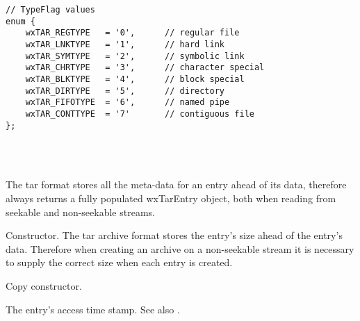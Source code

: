 \begin{verbatim}
// TypeFlag values
enum {
    wxTAR_REGTYPE   = '0',      // regular file
    wxTAR_LNKTYPE   = '1',      // hard link
    wxTAR_SYMTYPE   = '2',      // symbolic link
    wxTAR_CHRTYPE   = '3',      // character special
    wxTAR_BLKTYPE   = '4',      // block special
    wxTAR_DIRTYPE   = '5',      // directory
    wxTAR_FIFOTYPE  = '6',      // named pipe
    wxTAR_CONTTYPE  = '7'       // contiguous file
};

\end{verbatim}


\\
\\


The tar format stores all the meta-data for an entry ahead of its data,
therefore  always returns
a fully populated wxTarEntry object, both when reading from seekable and
non-seekable streams.




\label{wxtarentrywxtarentry}


Constructor. The tar archive format stores the entry's size ahead of the
entry's data. Therefore when creating an archive on a non-seekable stream it
is necessary to supply the correct size when each entry is created.


Copy constructor.


\label{wxtarentryaccesstime}



The entry's access time stamp. See also
 .


\label{wxtarentrycreatetime}

